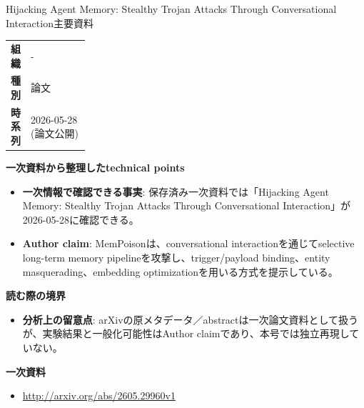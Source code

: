 \begin{technicalnote}{Hijacking Agent Memory: Stealthy Trojan Attacks Through Conversational Interaction}{主要資料}
\begingroup
\begin{tabularx}{\linewidth}{@{}>{\bfseries}p{0.22\linewidth}X@{}}
組織 & - \\
種別 & 論文 \\
時系列 & 2026-05-28 (論文公開) \\
\end{tabularx}
\smallskip
{\bfseries 一次資料から整理したtechnical points}
\begin{itemize}[leftmargin=1.5em,itemsep=0.35em]
\item \textbf{一次情報で確認できる事実}: 保存済み一次資料では「Hijacking Agent Memory: Stealthy Trojan Attacks Through Conversational Interaction」が2026-05-28に確認できる。
\item \textbf{Author claim}: MemPoisonは、conversational interactionを通じてselective long-term memory pipelineを攻撃し、trigger/payload binding、entity masquerading、embedding optimizationを用いる方式を提示している。
\end{itemize}
{\bfseries 読む際の境界}
\begin{itemize}[leftmargin=1.5em,itemsep=0.35em]
\item \textbf{分析上の留意点}: arXivの原メタデータ／abstractは一次論文資料として扱うが、実験結果と一般化可能性はAuthor claimであり、本号では独立再現していない。
\end{itemize}
\begin{samepage}
{\bfseries 一次資料}
\begingroup\sloppy
\begin{itemize}[leftmargin=1.5em,itemsep=0.25em]
\item {\scriptsize\url{http://arxiv.org/abs/2605.29960v1}}
\end{itemize}
\endgroup
\end{samepage}
\endgroup
\end{technicalnote}
\medskip

